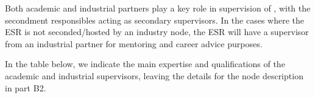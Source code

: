 Both academic and industrial partners play a key role in supervision of \acronym, with the secondment responsibles acting as secondary supervisors. 
In the cases where the ESR is not seconded/hosted by an industry node, the ESR will have a supervisor from an industrial partner for mentoring and career advice purposes. 

In the table below, we indicate the main expertise and qualifications of the academic and industrial supervisors, leaving the details for the node description in part B2. 



